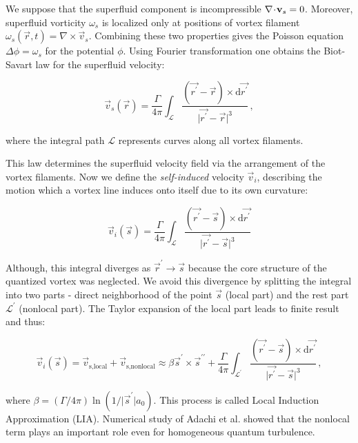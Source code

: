 We suppose that the superfluid component is incompressible $\nabla \!\cdot\! \mathbf{v}_s = 0$. Moreover, superfluid vorticity $\omega_s$ is localized only at positions of vortex filament $\omega_s(\vec{r},t) = \nabla \times \vec{v}_s$. Combining these two properties gives the Poisson equation $\Delta \phi = \omega_s$ for the potential $\phi$.
Using Fourier transformation one obtains the Biot-Savart law for the superfluid velocity:

\begin{equation}
\vec{v}_s(\vec{r}) = \frac{\Gamma}{4\pi} \int_{\mathcal{L}} \frac{(\vec{r^{\prime}} - \vec{r}) \times \text{d}\vec{r^{\prime}}}{\vert \vec{r^{\prime}} - \vec{r} \vert^3}\,,
\end{equation}

where the integral path $\mathcal{L}$ represents curves along all vortex filaments.

This law determines the superfluid velocity field via the arrangement of the vortex
filaments. Now we define the \textit{self-induced} velocity $\vec{v}_i$, describing the motion which a vortex line induces onto itself due to its own curvature:

\begin{equation}
\vec{v}_i(\vec{s}) = \frac{\Gamma}{4\pi} \int_{\mathcal{L}} \frac{(\vec{r^{\prime}} - \vec{s}) \times \text{d}\vec{r^{\prime}}}{\vert \vec{r^{\prime}} - \vec{s} \vert^3}
\end{equation}

Although, this integral diverges as $\vec{r}^{\prime} \rightarrow \vec{s}$ because the core structure
of the quantized vortex was neglected. We avoid this divergence by splitting the integral into two parts - direct neighborhood of the point $\vec{s}$ (local part) and the rest part $\mathcal{L}^{\prime}$ (nonlocal part). The Taylor expansion of the local part leads to finite result and thus:

\begin{equation}
\vec{v}_i(\vec{s})
= \vec{v}_{\text{s,local}} + \vec{v}_{\text{s,nonlocal}}
\approx \beta \vec{s}^{\prime} \times \vec{s}^{\prime \prime} + \frac{\Gamma}{4\pi} \int_{\mathcal{L}^{\prime}} \frac{(\vec{r^{\prime}} - \vec{s}) \times \text{d}\vec{r^{\prime}}}{\vert \vec{r^{\prime}} - \vec{s} \vert^3}\,,
\end{equation}

where $\beta = (\Gamma / 4\pi) \ln(1/\vert\vec{s}^{\prime}\vert a_0)$. This process is called Local Induction Approximation (LIA). Numerical study of Adachi et al. showed that the nonlocal term plays an important role even for homogeneous quantum turbulence.


